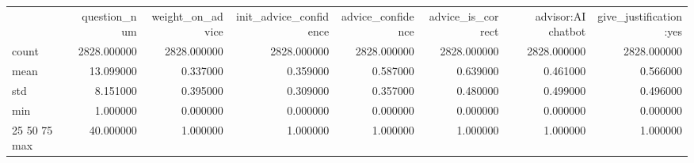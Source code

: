 \begin{tabular}{lrrrrrrr}
 & question_num & weight_on_advice & init_advice_confidence & advice_confidence & advice_is_correct & advisor:AI chatbot & give_justification:yes \\
count & 2828.000000 & 2828.000000 & 2828.000000 & 2828.000000 & 2828.000000 & 2828.000000 & 2828.000000 \\
mean & 13.099000 & 0.337000 & 0.359000 & 0.587000 & 0.639000 & 0.461000 & 0.566000 \\
std & 8.151000 & 0.395000 & 0.309000 & 0.357000 & 0.480000 & 0.499000 & 0.496000 \\
min & 1.000000 & 0.000000 & 0.000000 & 0.000000 & 0.000000 & 0.000000 & 0.000000 \\
25%
50%
75%
max & 40.000000 & 1.000000 & 1.000000 & 1.000000 & 1.000000 & 1.000000 & 1.000000 \\
\end{tabular}
